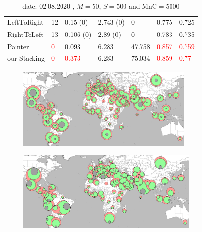 \documentclass{beamer}
\newcommand{\red}{\textcolor{red}}
\begin{document}
\begin{frame}
\begin{table}[!h]
\begin{table}[!h]
\begin{center}
{\begin{tabular}{| l || p{1.3cm} | p{1.7cm} | p{1.7cm} | p{1.5cm} | p{1.5cm} | p{1.5cm} |}
      LeftToRight  & 12      & 0.15 (0)    & 2.743 (0)    & 0             & 0.775           & 0.725         \\

      RightToLeft  & 13      & 0.106 (0)    & 2.89 (0)     & 0             & 0.783           & 0.735         \\
\hline
      Painter      &\red 0       & 0.093        & 6.283        & 47.758        & \red{ 0.857  }         & \red{ 0.759  }       \\

      our Stacking &\red 0       & \red{0.373}        & 6.283        & 75.034        & \red{ 0.859 }     &     \red{ 0.77 }        \\

      \hline
    \end{tabular}}
  \end{center}
 \caption{
  date: 02.08.2020  , $M=50$, $S=500$ and $\text{MnC}=5000$ }
\end{table}
\end{table}
\end{frame}


\begin{frame}
\begin{figure}[!t]
  \centering
  \includegraphics[height=4cm]{assets/MinMinAbsEval.png}
\end{figure}
\begin{figure}[!t]
  \centering
  \includegraphics[height=4cm]{assets/hawaiianEval.png}
\end{figure}
\end{frame}
\end{document}
